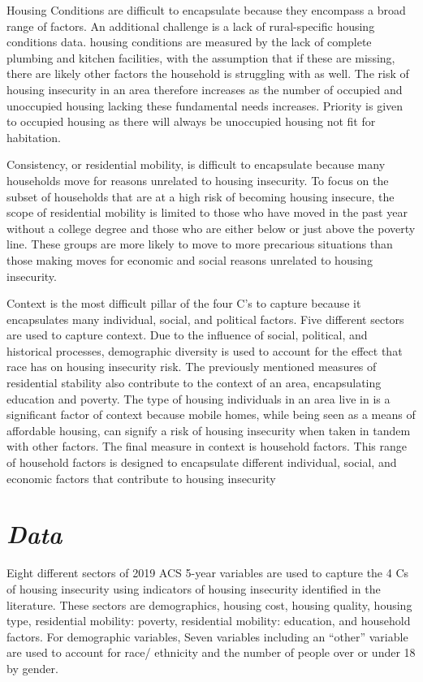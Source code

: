 Housing Conditions are difficult to encapsulate because they encompass a broad range of factors. An additional challenge is a lack of rural-specific housing conditions data. housing conditions are measured by the lack of complete plumbing and kitchen facilities, with the assumption that if these are missing, there are likely other factors the household is struggling with as well. The risk of housing insecurity in an area therefore increases as the number of occupied and unoccupied housing lacking these fundamental needs increases. Priority is given to occupied housing as there will always be unoccupied housing not fit for habitation. 

Consistency, or residential mobility, is difficult to encapsulate because many households move for reasons unrelated to housing insecurity. To focus on the subset of households that are at a high risk of becoming housing insecure, the scope of residential mobility is limited to those who have moved in the past year without a college degree and those who are either below or just above the poverty line. These groups are more likely to move to more precarious situations than those making moves for economic and social reasons unrelated to housing insecurity. 

Context is the most difficult pillar of the four C's to capture because it encapsulates many individual, social, and political factors. Five different sectors are used to capture context. Due to the influence of social, political, and historical processes, demographic diversity is used to account for the effect that race has on housing insecurity risk. The previously mentioned measures of residential stability also contribute to the context of an area, encapsulating education and poverty. The type of housing individuals in an area live in is a significant factor of context because mobile homes, while being seen as a means of affordable housing, can signify a risk of housing insecurity when taken in tandem with other factors. The final measure in context is household factors. This range of household factors is designed to encapsulate different individual, social, and economic factors that contribute to housing insecurity 

\section{\textit{Data}}

Eight different sectors of 2019 ACS 5-year variables are used to capture the 4 Cs of housing insecurity using indicators of housing insecurity identified in the literature. These sectors are demographics, housing cost, housing quality, housing type, residential mobility: poverty, residential mobility: education, and household factors. For demographic variables, Seven variables including an “other” variable are used to account for race/ ethnicity and the number of people over or under 18 by gender. 

